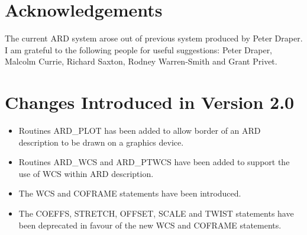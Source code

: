 \section{Acknowledgements}

The current ARD system arose out of previous system produced by Peter Draper. I
am grateful to the following people for useful suggestions: Peter Draper,
Malcolm Currie, Richard Saxton, Rodney Warren-Smith and Grant Privet. 

\section{Changes Introduced in Version 2.0}

\begin{itemize}

\item Routines ARD\_PLOT has been added to allow border of an ARD
description to be drawn on a graphics device.

\item Routines ARD\_WCS and ARD\_PTWCS have been added to support the use
of WCS within ARD description.

\item The WCS and COFRAME statements have been introduced.

\item The COEFFS, STRETCH, OFFSET, SCALE and TWIST statements have been
deprecated in favour of the new WCS and COFRAME statements.

\end{itemize}


